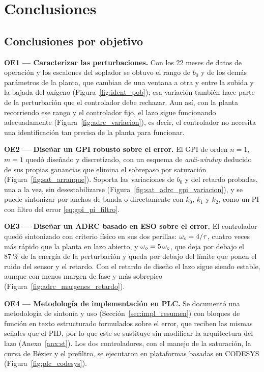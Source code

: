 \chapter{Conclusiones}
\label{cap:conclusiones}

\section{Conclusiones por objetivo}

\textbf{OE1 --- Caracterizar las perturbaciones.} Con los 22 meses de datos de operación y los
escalones del soplador se obtuvo el rango de $b_0$ y de los demás parámetros de la planta, que
cambian de una ventana a otra y entre la subida y la bajada del oxígeno (Figura~\ref{fig:ident_pob});
esa variación también hace parte de la perturbación que el controlador debe rechazar. Aun así, con la
planta recorriendo ese rango y el controlador fijo, el lazo sigue funcionando adecuadamente
(Figura~\ref{fig:adrc_variacion}), es decir, el controlador no necesita una identificación tan precisa
de la planta para funcionar.

\textbf{OE2 --- Diseñar un GPI robusto sobre el error.} El GPI de orden $n=1$, $m=1$ quedó diseñado y
discretizado, con un esquema de \emph{anti-windup} deducido de sus propias ganancias que elimina el
sobrepaso por saturación (Figura~\ref{fig:sat_arranque}). Soporta las variaciones de $b_0$ y del retardo
probadas, una a la vez, sin desestabilizarse (Figura~\ref{fig:sat_adrc_gpi_variacion}), y se puede
sintonizar por anchos de banda o directamente con $k_0$, $k_1$ y $k_2$, como un PI con filtro del error
\eqref{eq:gpi_pi_filtro}.

\textbf{OE3 --- Diseñar un ADRC basado en ESO sobre el error.} El controlador quedó sintonizado con
criterio físico en sus dos perillas: $\omega_{c} = 4/\tau$, cuatro veces más rápido que la planta en lazo
abierto, y $\omega_{o} = 5\,\omega_{c}$, que deja por debajo el $87~\%$ de la energía de la perturbación y queda por debajo del límite que ponen
el ruido del sensor y el retardo. Con el retardo de diseño el lazo sigue siendo estable, aunque con
menos margen de fase y más sobrepico (Figura~\ref{fig:adrc_margenes_retardo}).

\textbf{OE4 --- Metodología de implementación en PLC.} Se documentó una metodología de sintonía y uso
(Sección~\ref{sec:impl_resumen}) con bloques de función en texto estructurado formulados sobre el error,
que reciben las mismas señales que el PID, por lo que este se sustituye sin modificar la arquitectura del lazo
(Anexo~\ref{anx:st}). Los dos controladores, con el manejo de la saturación, la curva de Bézier y el
prefiltro, se ejecutaron en plataformas basadas en CODESYS (Figura~\ref{fig:plc_codesys}).

